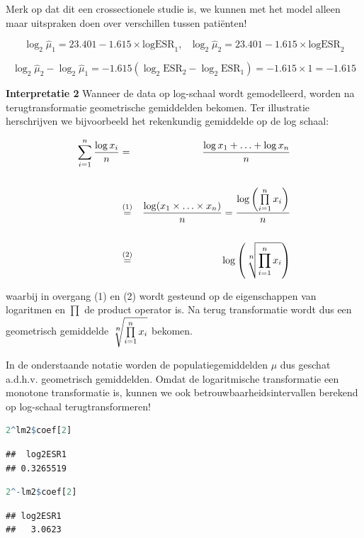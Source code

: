 \documentclass[
  12pt,dutch,coursenotes]{book}
\begin{document}
Merk op dat dit een crossectionele studie is, we kunnen met het model alleen maar uitspraken doen over verschillen tussen patiënten!

\[\log_2 \hat\mu_1=23.401  -1.615 \times \text{logESR}_1,\text{ } \log_2 \hat\mu_2=23.401  -1.615 \times \text{logESR}_2 \]

\[\log_2 \hat\mu_2-\log_2 \hat\mu_1=  -1.615 (\log_2 \text{ESR}_2-\log_2 \text{ESR}_1) = -1.615 \times 1 = -1.615\]

\textbf{Interpretatie 2}
Wanneer de data op log-schaal wordt gemodelleerd, worden na terugtransformatie geometrische gemiddelden bekomen.
Ter illustratie herschrijven we bijvoorbeeld het rekenkundig gemiddelde op de log schaal:

\begin{eqnarray*}
\sum\limits_{i=1}^n \frac{\log x_i}{n}&=&\frac{\log x_1 + \ldots + \log x_n}{n}\\\\
&\stackrel{(1)}{=}&\frac{\log(x_1 \times \ldots \times x_n)}{n}=\frac{\log\left(\prod\limits_{i=1}^n x_i\right)}{n}\\\\
&\stackrel{(2)}{=}&\log \left(\sqrt[\leftroot{-1}\uproot{2}\scriptstyle n]{\prod\limits_{i=1}^n x_i}\right)
\end{eqnarray*}

waarbij in overgang (1) en (2) wordt gesteund op de eigenschappen van logaritmen en \(\prod\) de product operator is.
Na terug transformatie wordt dus een geometrisch gemiddelde \(\sqrt[\leftroot{-1}\uproot{2}\scriptstyle n]{\prod\limits_{i=1}^n x_i}\) bekomen.

In de onderstaande notatie worden de populatiegemiddelden \(\mu\) dus geschat a.d.h.v. geometrisch gemiddelden.
Omdat de logaritmische transformatie een monotone transformatie is, kunnen we ook betrouwbaarheidsintervallen berekend op log-schaal terugtransformeren!

\begin{lstlisting}[language=R]
2^lm2$coef[2]
\end{lstlisting}

\begin{lstlisting}
##  log2ESR1 
## 0.3265519
\end{lstlisting}

\begin{lstlisting}[language=R]
2^-lm2$coef[2]
\end{lstlisting}

\begin{lstlisting}
## log2ESR1 
##   3.0623
\end{lstlisting}
\end{document}
